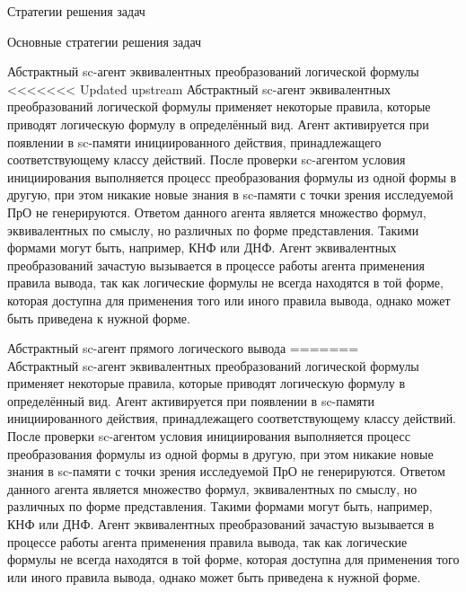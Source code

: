 \begin{frame}{Стратегии решения задач}
\begin{frame}{\large Основные стратегии решения задач}
\begin{textitemize}
\begin{frame}{\Large Абстрактный sc-агент эквивалентных преобразований логической формулы}
<<<<<<< Updated upstream
\vspace{10mm}
  Абстрактный sc-агент эквивалентных преобразований логической формулы применяет некоторые правила, которые приводят логическую формулу в определённый вид. Агент активируется при появлении в sc-памяти инициированного действия, принадлежащего соответствующему классу действий. После проверки sc-агентом условия инициирования выполняется процесс преобразования формулы из одной формы в другую, при этом никакие новые знания в sc-памяти с точки зрения исследуемой ПрО не генерируются. Ответом данного агента является множество формул, эквивалентных по смыслу, но различных по форме представления. Такими формами могут быть, например, КНФ или ДНФ. Агент эквивалентных преобразований зачастую вызывается в процессе работы агента применения правила вывода, так как логические формулы не всегда находятся в той форме, которая доступна для применения того или иного правила вывода, однако может быть приведена к нужной форме.  
\end{frame}

\begin{frame}{\Large Абстрактный sc-агент прямого логического вывода}
\vspace{10mm}
=======
\topline
\vspace{10mm}
 \\

  Абстрактный sc-агент эквивалентных преобразований логической формулы применяет некоторые правила, которые приводят логическую формулу в определённый вид. Агент активируется при появлении в sc-памяти инициированного действия, принадлежащего соответствующему классу действий. После проверки sc-агентом условия инициирования выполняется процесс преобразования формулы из одной формы в другую, при этом никакие новые знания в sc-памяти с точки зрения исследуемой ПрО не генерируются. Ответом данного агента является множество формул, эквивалентных по смыслу, но различных по форме представления. Такими формами могут быть, например, КНФ или ДНФ. Агент эквивалентных преобразований зачастую вызывается в процессе работы агента применения правила вывода, так как логические формулы не всегда находятся в той форме, которая доступна для применения того или иного правила вывода, однако может быть приведена к нужной форме.  
\end{frame}

\begin{frame}{}
\vspace{15}
 \\


\end{frame}
\end{textitemize}
\end{frame}
\end{frame}
